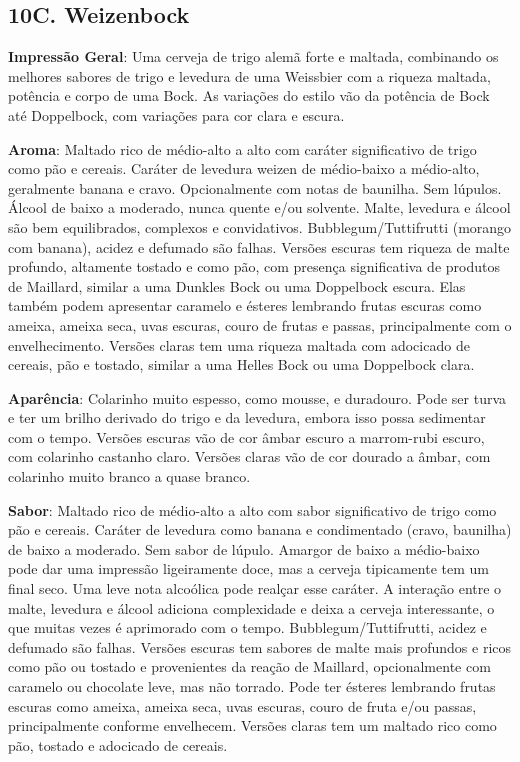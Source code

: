 \subsection*{10C. Weizenbock}
\textbf{Impressão Geral}: Uma cerveja de trigo alemã forte e maltada, combinando os melhores sabores de trigo e levedura de uma Weissbier com a riqueza maltada, potência e corpo de uma Bock. As variações do estilo vão da potência de Bock até Doppelbock, com variações para cor clara e escura.

\textbf{Aroma}: Maltado rico de médio-alto a alto com caráter significativo de trigo como pão e cereais. Caráter de levedura weizen de médio-baixo a médio-alto, geralmente banana e cravo. Opcionalmente com notas de baunilha. Sem lúpulos. Álcool de baixo a moderado, nunca quente e/ou solvente. Malte, levedura e álcool são bem equilibrados, complexos e convidativos. Bubblegum/Tuttifrutti (morango com banana), acidez e defumado são falhas.
Versões escuras tem riqueza de malte profundo, altamente tostado e como pão, com presença significativa de produtos de Maillard, similar a uma Dunkles Bock ou uma Doppelbock escura. Elas também podem apresentar caramelo e ésteres lembrando frutas escuras como ameixa, ameixa seca, uvas escuras, couro de frutas e passas, principalmente com o envelhecimento.
Versões claras tem uma riqueza maltada com adocicado de cereais, pão e tostado, similar a uma Helles Bock ou uma Doppelbock clara.

\textbf{Aparência}: Colarinho muito espesso, como mousse, e duradouro. Pode ser turva e ter um brilho derivado do trigo e da levedura, embora isso possa sedimentar com o tempo.
Versões escuras vão de cor âmbar escuro a marrom-rubi escuro, com colarinho castanho claro.
Versões claras vão de cor dourado a âmbar, com colarinho muito branco a quase branco.

\textbf{Sabor}: Maltado rico de médio-alto a alto com sabor significativo de trigo como pão e cereais. Caráter de levedura como banana e condimentado (cravo, baunilha) de baixo a moderado. Sem sabor de lúpulo. Amargor de baixo a médio-baixo pode dar uma impressão ligeiramente doce, mas a cerveja tipicamente tem um final seco. Uma leve nota alcoólica pode realçar esse caráter. A interação entre o malte, levedura e álcool adiciona complexidade e deixa a cerveja interessante, o que muitas vezes é aprimorado com o tempo. Bubblegum/Tuttifrutti, acidez e defumado são falhas.
Versões escuras tem sabores de malte mais profundos e ricos como pão ou tostado e provenientes da reação de Maillard, opcionalmente com caramelo ou chocolate leve, mas não torrado. Pode ter ésteres lembrando frutas escuras como ameixa, ameixa seca, uvas escuras, couro de fruta e/ou passas, principalmente conforme envelhecem.
Versões claras tem um maltado rico como pão, tostado e adocicado de cereais.

